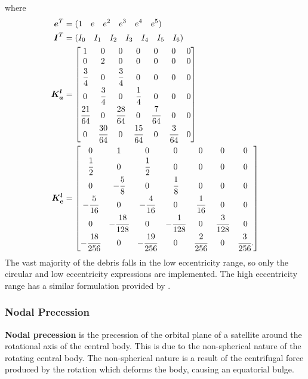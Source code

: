 \documentclass[a4paper, 12pt]{article}
\newcommand{\lindex}[1]{%
	\lowercase{\def\temp{#1}}%
	\expandafter\index\expandafter{\temp}%
}
\newcommand{\boldindex}[1]{%
	\textbf{#1}\lindex{#1}%
}
\begin{document}
where \begin{align}
	 \boldsymbol{e}^T &=(1\quad  e\quad e^2\quad e^3\quad e^4\quad e^5)\\
	\boldsymbol{I}^T &=(I_0\quad  I_1\quad I_2\quad I_3\quad I_4\quad I_5\quad I_6)\\
	\boldsymbol{K_a^l} &= \begin{bmatrix}
		1 & 0 & 0 & 0 &0&0 &0\\
		0 & 2 & 0 & 0 &0&0 &0\\
		\cfrac{3}{4} & 0 & \cfrac{3}{4} & 0 &0&0 &0\\
		0 & \cfrac{3}{4} & 0 & \cfrac{1}{4} &0&0 &0\\
	    \cfrac{21}{64} & 0 & \cfrac{28}{64} & 0 &\cfrac{7}{64}&0 &0\\
	    0 & \cfrac{30}{64} & 0 & \cfrac{15}{64} &0&\cfrac{3}{64} &0\\
	\end{bmatrix}\\
	\boldsymbol{K_e^l} &= \begin{bmatrix}
		0 & 1 & 0 & 0 &0&0 &0\\
		\cfrac{1}{2} & 0 & \cfrac{1}{2} & 0 &0&0 &0\\
		0 & -\cfrac{5}{8}  & 0 & \cfrac{1}{8}  &0&0 &0\\
		-\cfrac{5}{16}  & 0 & -\cfrac{4}{16}  &0 &\cfrac{1}{16} &0 &0\\
		0 & -\cfrac{18}{128} & 0& -\cfrac{1}{128}  &0&\cfrac{3}{128}  &0\\
		-\cfrac{18}{256}  & 0 & -\cfrac{19}{256}  & 0 &\cfrac{2}{256} &0 &\cfrac{3}{256}.\\
	\end{bmatrix}
\end{align}
The vast majority of the debris falls in the low eccentricity range, so only the circular and low eccentricity expressions are implemented. The high eccentricity range has a similar formulation provided by \cite{frey_extension_2019}.

\subsubsection{Nodal Precession}

\boldindex{Nodal precession} is the precession of the orbital plane of a satellite around the rotational axis of the central body. This is due to the non-spherical nature of the rotating central body. The non-spherical nature is a result of the centrifugal force produced by the rotation which  deforms the body, causing an equatorial bulge.
\end{document}
